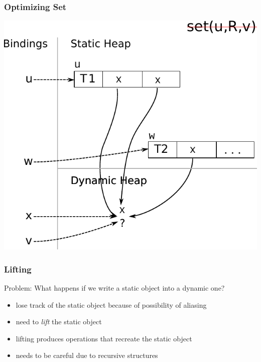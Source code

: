 \documentclass[utf8x]{beamer}
\begin{document}
\begin{frame}[plain]
  \frametitle{Optimizing Set}
  \includegraphics[scale=0.8]{figures/opt_set2}
\end{frame}

\begin{frame}
  \frametitle{Lifting}
  Problem: What happens if we write a static object into a dynamic one?
  \pause
  \begin{itemize}
      \item lose track of the static object because of possibility of aliasing
      \item need to \emph{lift} the static object
      \item lifting produces operations that recreate the static object
      \pause
      \item needs to be careful due to recursive structures
  \end{itemize}
\end{frame}
\end{document}
